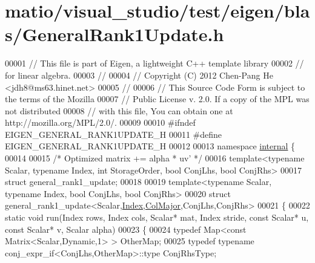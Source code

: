 \hypertarget{matio_2visual__studio_2test_2eigen_2blas_2_general_rank1_update_8h_source}{}\section{matio/visual\+\_\+studio/test/eigen/blas/\+General\+Rank1\+Update.h}
\label{matio_2visual__studio_2test_2eigen_2blas_2_general_rank1_update_8h_source}

\begin{DoxyCode}
00001 \textcolor{comment}{// This file is part of Eigen, a lightweight C++ template library}
00002 \textcolor{comment}{// for linear algebra.}
00003 \textcolor{comment}{//}
00004 \textcolor{comment}{// Copyright (C) 2012 Chen-Pang He <jdh8@ms63.hinet.net>}
00005 \textcolor{comment}{//}
00006 \textcolor{comment}{// This Source Code Form is subject to the terms of the Mozilla}
00007 \textcolor{comment}{// Public License v. 2.0. If a copy of the MPL was not distributed}
00008 \textcolor{comment}{// with this file, You can obtain one at http://mozilla.org/MPL/2.0/.}
00009 
00010 \textcolor{preprocessor}{#ifndef EIGEN\_GENERAL\_RANK1UPDATE\_H}
00011 \textcolor{preprocessor}{#define EIGEN\_GENERAL\_RANK1UPDATE\_H}
00012 
00013 \textcolor{keyword}{namespace }\hyperlink{namespaceinternal}{internal} \{
00014 
00015 \textcolor{comment}{/* Optimized matrix += alpha * uv' */}
00016 \textcolor{keyword}{template}<\textcolor{keyword}{typename} Scalar, \textcolor{keyword}{typename} Index, \textcolor{keywordtype}{int} StorageOrder, \textcolor{keywordtype}{bool} ConjLhs, \textcolor{keywordtype}{bool} ConjRhs>
00017 \textcolor{keyword}{struct }general\_rank1\_update;
00018 
00019 \textcolor{keyword}{template}<\textcolor{keyword}{typename} Scalar, \textcolor{keyword}{typename} Index, \textcolor{keywordtype}{bool} ConjLhs, \textcolor{keywordtype}{bool} ConjRhs>
00020 \textcolor{keyword}{struct }general\_rank1\_update<Scalar,\hyperlink{namespace_eigen_a62e77e0933482dafde8fe197d9a2cfde}{Index},\hyperlink{group__enums_ggaacded1a18ae58b0f554751f6cdf9eb13a0cbd4bdd0abcfc0224c5fcb5e4f6669a}{ColMajor},ConjLhs,ConjRhs>
00021 \{
00022   \textcolor{keyword}{static} \textcolor{keywordtype}{void} run(Index rows, Index cols, Scalar* mat, Index stride, \textcolor{keyword}{const} Scalar* u, \textcolor{keyword}{const} Scalar* v, 
      Scalar alpha)
00023   \{
00024     \textcolor{keyword}{typedef} Map<const Matrix<Scalar,Dynamic,1> > OtherMap;
00025     \textcolor{keyword}{typedef} \textcolor{keyword}{typename} conj\_expr\_if<ConjLhs,OtherMap>::type ConjRhsType;

\end{DoxyCode}
